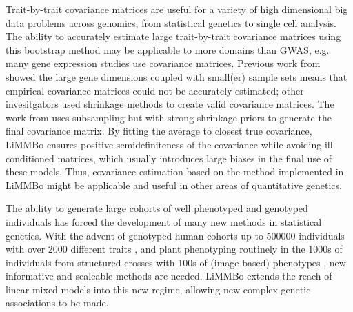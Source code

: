 Trait-by-trait covariance matrices are useful for a variety of high dimensional big data problems across genomics, from statistical genetics to single cell analysis. The ability to accurately estimate large trait-by-trait covariance matrices using this bootstrap method may be applicable to more domains than GWAS, e.g. many gene expression studies use covariance matrices. Previous work from \citet{Schaefer2005} showed the large gene dimensions coupled with small(er) sample sets means that empirical covariance matrices could not be accurately estimated; other invesitgators \citep{Ledoit2004,Furrer2007,Bickel2008} used shrinkage methods to create valid covariance matrices. The work from \citet{Teng2009} uses subsampling but with strong shrinkage priors to generate the final covariance matrix. By fitting the average to closest true covariance, LiMMBo ensures positive-semidefiniteness of the covariance while avoiding ill-conditioned matrices, which usually introduces large biases in the final use of these models. Thus, covariance estimation based on the method implemented in LiMMBo might be applicable and useful in other areas of quantitative genetics.  

The ability to generate large cohorts of well phenotyped and genotyped individuals has forced the development of many new methods in statistical genetics. With the advent of genotyped human cohorts up to \num{500000} individuals with over \num{2000} different traits \citep{Sudlow2015}, and plant phenotyping routinely in the \num{1000}s of individuals from structured crosses with \num{100}s of (image-based) phenotypes \citep{Atwell2010,Yang2014}, new informative and scaleable methods are needed. LiMMBo extends the reach of linear mixed models into this new regime, allowing new complex genetic associations to be made.
